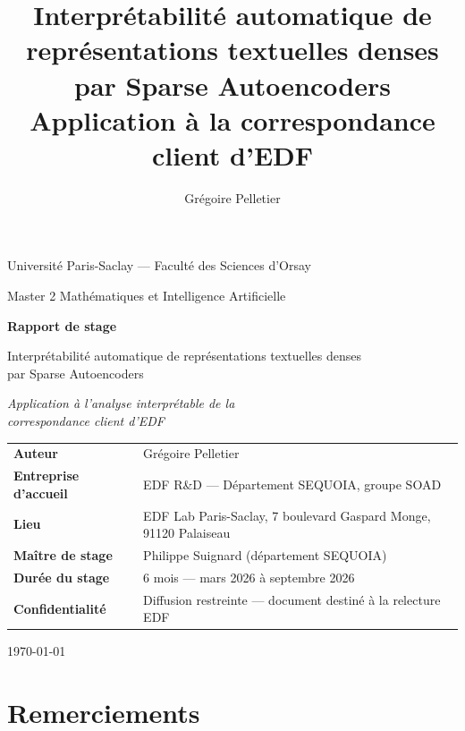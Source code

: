 \documentclass[11pt]{article}
\title{Interprétabilité automatique de représentations textuelles denses par Sparse Autoencoders\\
\large Application à la correspondance client d'EDF}
\author{Grégoire Pelletier}
\date{}
\begin{document}
\begin{titlepage}
\centering
\vspace*{1cm}
{\large Université Paris-Saclay --- Faculté des Sciences d'Orsay\par}
{\large Master 2 Mathématiques et Intelligence Artificielle\par}
\vspace{2cm}
{\Huge\bfseries Rapport de stage\par}
\vspace{0.5cm}
{\LARGE Interprétabilité automatique de représentations textuelles denses\\ par Sparse Autoencoders\par}
\vspace{0.3cm}
{\Large\itshape Application à l'analyse interprétable de la\\ correspondance client d'EDF\par}
\vspace{0.6cm}

\begin{tabular}{ll}
\textbf{Auteur} & Grégoire Pelletier \\[0.3em]
\textbf{Entreprise d'accueil} & EDF R\&D --- Département SEQUOIA, groupe SOAD \\[0.3em]
\textbf{Lieu} & EDF Lab Paris-Saclay, 7 boulevard Gaspard Monge, 91120 Palaiseau \\[0.3em]
\textbf{Maître de stage} & Philippe Suignard (département SEQUOIA) \\[0.3em]
\textbf{Durée du stage} & 6 mois --- mars 2026 à septembre 2026 \\[0.3em]
\textbf{Confidentialité} & Diffusion restreinte --- document destiné à la relecture EDF \\[0.3em]
\end{tabular}

\vfill
{\large \today\par}
\end{titlepage}

\newpage
\section*{Remerciements}
\end{document}
